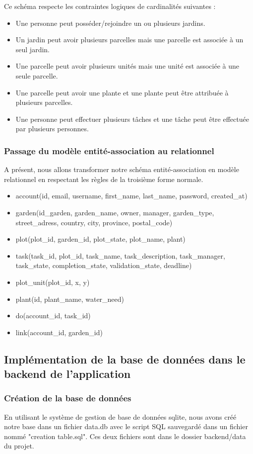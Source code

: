 \documentclass[french,a4paper]{article}
\begin{document}
Ce schéma respecte les contraintes logiques de cardinalités suivantes :
\begin{itemize}
    \item Une personne peut posséder/rejoindre un ou plusieurs jardins.
    \item Un jardin peut avoir plusieurs parcelles mais une parcelle est associée à un seul jardin.
    \item Une parcelle peut avoir plusieurs unités mais une unité est associée à une seule parcelle.
    \item Une parcelle peut avoir une plante et une plante peut être attribuée à plusieurs parcelles.
    \item Une personne peut effectuer plusieurs tâches et une tâche peut être effectuée par plusieurs personnes.
\end{itemize}

\subsubsection{Passage du modèle entité-association au relationnel}
A présent, nous allons transformer notre schéma entité-association en modèle relationnel en respectant les règles de la troisième forme
normale.

\begin{itemize}
    \item account(id, email, username, first\_name, last\_name, password, created\_at)
    \item garden(id\_garden, garden\_name, owner, manager, garden\_type, street\_adress, country, city, province, postal\_code)
    \item plot(plot\_id, garden\_id, plot\_state, plot\_name, plant)
    \item task(task\_id, plot\_id, task\_name, task\_description, task\_manager, task\_state, completion\_state, validation\_state, deadline)
    \item plot\_unit(plot\_id, x, y)
    \item plant(id, plant\_name, water\_need)
    \item do(account\_id, task\_id)
    \item link(account\_id, garden\_id)
\end{itemize}
\subsection{Implémentation de la base de données dans le backend de l'application}
\subsubsection{Création de la base de données}
En utilisant le système de gestion de base de données sqlite, nous avons créé notre base dans un fichier data.db avec le script
SQL sauvegardé dans un fichier nommé "creation table.sql". Ces deux fichiers sont dans le dossier backend/data du projet.
\end{document}
